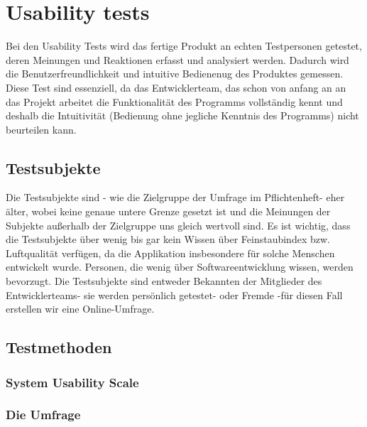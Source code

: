 \section{Usability tests}

Bei den Usability Tests wird das fertige Produkt an echten Testpersonen getestet, deren  Meinungen und Reaktionen erfasst und analysiert werden. Dadurch wird die Benutzerfreundlichkeit und intuitive Bedienenug des Produktes gemessen. Diese Test sind essenziell, da das Entwicklerteam, das schon von anfang an an das Projekt arbeitet die Funktionalität des Programms vollständig kennt und deshalb die Intuitivität (Bedienung ohne jegliche Kenntnis des Programms) nicht beurteilen kann.

\subsection{Testsubjekte}

Die Testsubjekte sind - wie die Zielgruppe der Umfrage im Pflichtenheft- eher älter, wobei keine genaue untere Grenze gesetzt ist und die Meinungen der Subjekte außerhalb der Zielgruppe uns gleich wertvoll sind. Es ist wichtig, dass die Testsubjekte über wenig bis gar kein Wissen über Feinstaubindex bzw. Luftqualität verfügen, da die Applikation insbesondere für solche Menschen entwickelt wurde. Personen, die wenig über Softwareentwicklung wissen, werden bevorzugt. Die Testsubjekte sind entweder Bekannten der Mitglieder des Entwicklerteams- sie werden persönlich getestet- oder Fremde -für diesen Fall erstellen wir eine Online-Umfrage. 

\subsection{Testmethoden} 
\subsubsection{System Usability Scale}
\subsubsection{Die Umfrage}
